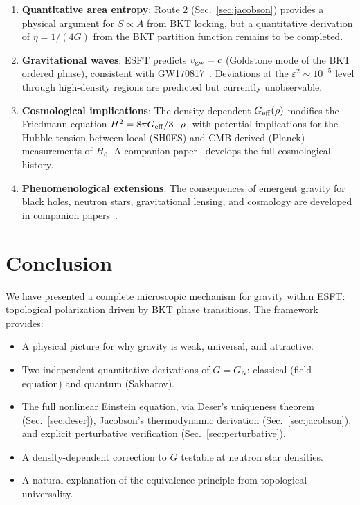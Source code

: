 ﻿\documentclass[twocolumn,preprintnumbers,amsmath,amssymb,prd]{revtex4-2}
\begin{document}
\begin{enumerate}
\item \textbf{Quantitative area entropy}: Route 2 (Sec.~\ref{sec:jacobson}) provides a physical argument for $S \propto A$ from BKT locking, but a quantitative derivation of $\eta = 1/(4G)$ from the BKT partition function remains to be completed.
\item \textbf{Gravitational waves}: ESFT predicts $v_{\rm gw} = c$ (Goldstone mode of the BKT ordered phase), consistent with GW170817~\cite{GW170817}. Deviations at the $\varepsilon^2 \sim 10^{-5}$ level through high-density regions are predicted but currently unobservable.
\item \textbf{Cosmological implications}: The density-dependent $G_{\rm eff}(\rho)$ modifies the Friedmann equation $H^2 = 8\pi G_{\rm eff}/3 \cdot \rho$, with potential implications for the Hubble tension between local (SH0ES) and CMB-derived (Planck) measurements of $H_0$. A companion paper~\cite{Paper12} develops the full cosmological history.
\item \textbf{Phenomenological extensions}: The consequences of emergent gravity for black holes, neutron stars, gravitational lensing, and cosmology are developed in companion papers~\cite{Paper8,Paper12}.
\end{enumerate}

\section{Conclusion}

We have presented a complete microscopic mechanism for gravity within ESFT: topological polarization driven by BKT phase transitions. The framework provides:
\begin{itemize}
\item A physical picture for why gravity is weak, universal, and attractive.
\item Two independent quantitative derivations of $G = G_N$: classical (field equation) and quantum (Sakharov).
\item The full nonlinear Einstein equation, via Deser's uniqueness theorem (Sec.~\ref{sec:deser}), Jacobson's thermodynamic derivation (Sec.~\ref{sec:jacobson}), and explicit perturbative verification (Sec.~\ref{sec:perturbative}).
\item A density-dependent correction to $G$ testable at neutron star densities.
\item A natural explanation of the equivalence principle from topological universality.
\end{itemize}
\end{document}
